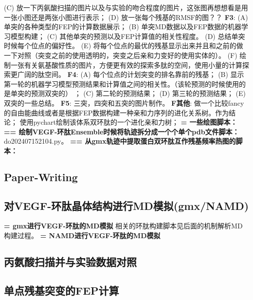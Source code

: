 (C) 放一下丙氨酸扫描的图片以及与实验的吻合程度的图片，这张图再想想看是用一张小图还是两张小图进行表示；
(D) 放一张每个残基的RMSF的图？？
\newline\textbf{F3}: (A) 单突的各种类型的FEP的计算数据展示；
(B) 单突MD数据以及FEP数据的机器学习模型构建；
(C) 其他单突的预测以及FEP计算值的相关性程度。
(D) 总结单突时候每个位点的偏好性。
(E) 将每个位点的最优的残基显示出来并且和之前的做一下对照（突变之前的使用透明的，突变之后亲和力变好的使用实体的）。
(F) 绘制一张有关氨基酸性质的图片，方便更有效的探索多肽的空间，使用小量的计算探索更广阔的肽空间。
\newline\textbf{F4}: (A) 每个位点的计划突变的排名靠前的残基；
(B) 显示第一轮的机器学习模型预测结果和计算值之间的相关性。（该轮预测的时候使用的是单突的预测双突的） ；
(C) 第二轮的预测结果；
(D) 第三轮的预测结果；
(E) 双突的一些总结。
\newline\textbf{F5}: 三突，四突和五突的图片制作。
\newline\textbf{F其他}: 做一个比较fancy的自由能曲线或者是根据FEP数据构建一种亲和力序列的进化关系树。作为结论；
使用pychart绘制该体系双环肽的一个进化亲和力树；
\newline \textbf{= 一些绘图脚本：}
\newline \textbf{== 绘制VEGF-环肽Ensemble时候将轨迹拆分成一个个单个pdb文件脚本：}do202407152104.py。
\newline \textbf{== 从gmx轨迹中提取蛋白双环肽互作残基频率热图的脚本：}
\subsection{Paper-Writing}
\subsection{对VEGF-环肽晶体结构进行MD模拟(gmx/NAMD)}
\noindent \textbf{= gmx进行VEGF-环肽的MD模拟}
\newline 相关的环肽构建脚本见后面的机制解析MD构建过程。
\newline \textbf{= NAMD进行VEGF-环肽的MD模拟}
\subsection{丙氨酸扫描并与实验数据对照}
\subsection{单点残基突变的FEP计算}
